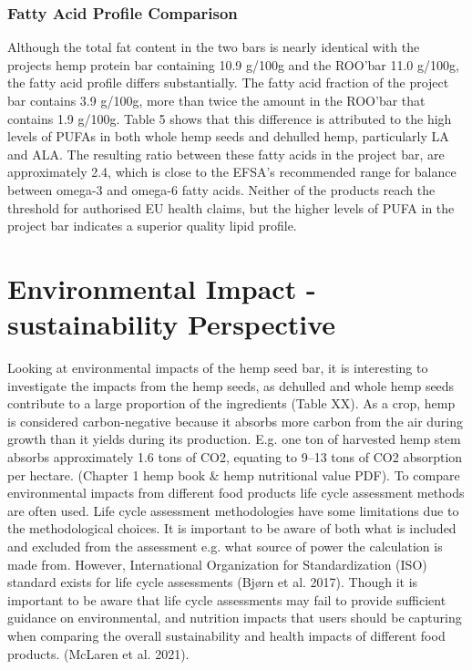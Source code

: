 \subsubsection{Fatty Acid Profile Comparison}
Although the total fat content in the two bars is nearly identical with the projects hemp protein bar containing 10.9 g/100g and the ROO’bar 11.0 g/100g, the fatty acid profile differs substantially. The fatty acid fraction of the project bar contains 3.9 g/100g, more than twice the amount in the ROO’bar that contains 1.9 g/100g. Table 5 shows that this difference is attributed to the high levels of PUFAs in both whole hemp seeds and dehulled hemp, particularly LA and ALA. The resulting ratio between these fatty acids in the project bar, are approximately 2.4, which is close to the EFSA’s recommended range for balance between omega-3 and omega-6 fatty acids. Neither of the products reach the threshold for authorised EU health claims, but the higher levels of PUFA in the project bar indicates a superior quality lipid profile.

\section{Environmental Impact - sustainability Perspective}
Looking at environmental impacts of the hemp seed bar, it is interesting to investigate the impacts from the hemp seeds, as dehulled and whole hemp seeds contribute to a large proportion of the ingredients (Table XX). As a crop, hemp is considered carbon-negative because it absorbs more carbon from the air during growth than it yields during its production. E.g. one ton of harvested hemp stem absorbs approximately 1.6 tons of CO2, equating to 9–13 tons of CO2 absorption per hectare. (Chapter 1 hemp book \& hemp nutritional value PDF). To compare environmental impacts from different food products life cycle assessment methods are often used. Life cycle assessment methodologies have some limitations due to the methodological choices. It is important to be aware of both what is included and excluded from the assessment e.g. what source of power the calculation is made from. However, International Organization for Standardization (ISO) standard exists for life cycle assessments (Bjørn et al. 2017). Though it is important to be aware that life cycle assessments may fail to provide sufficient guidance on environmental, and nutrition impacts that users should be capturing when comparing the overall sustainability and health impacts of different food products. (McLaren et al. 2021).   

